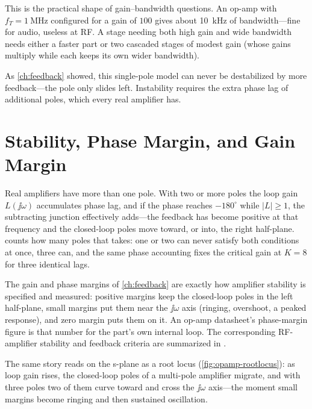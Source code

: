 \begin{exambox}
This is the practical shape of gain--bandwidth questions. An op-amp with
\(f_T=\SI{1}{\mega\hertz}\) configured for a gain of \(100\) gives about
\SI{10}{\kilo\hertz} of bandwidth---fine for audio, useless at RF. A stage needing
both high gain and wide bandwidth needs either a faster part or two cascaded stages of
modest gain (whose gains multiply while each keeps its own wider bandwidth).
\end{exambox}

As \cref{ch:feedback} showed, this single-pole model can never be destabilized by
more feedback---the pole only slides left. Instability requires the extra phase lag
of additional poles, which every real amplifier has.

\section{Stability, Phase Margin, and Gain Margin}
Real amplifiers have more than one pole. With two or more poles the loop gain
\(L(\jj\omega)\) accumulates phase lag, and if the phase reaches \(-180^\circ\)
while \(|L|\ge 1\), the subtracting junction effectively adds---the feedback has
become positive at that frequency and the closed-loop poles move toward, or
into, the right half-plane.  counts how many poles that takes:
one or two can never satisfy both conditions at once, three can, and the same
phase accounting fixes the critical gain at \(K=8\) for three identical lags.

The gain and phase margins of \cref{ch:feedback} are exactly how amplifier
stability is specified and measured: positive margins keep the closed-loop poles in
the left half-plane, small margins put them near the \(\jj\omega\) axis (ringing,
overshoot, a peaked response), and zero margin puts them on it. An op-amp datasheet's
phase-margin figure is that number for the part's own internal loop.
The corresponding RF-amplifier stability and feedback criteria are summarized in
\cite[pp.~185--195]{davis2011rfcircuit}.

The same story reads on the s-plane as a root locus (\cref{fig:opamp-rootlocus}):
as loop gain rises, the closed-loop poles of a multi-pole amplifier migrate, and with
three poles two of them curve toward and cross the \(\jj\omega\) axis---the moment
small margins become ringing and then sustained oscillation.

